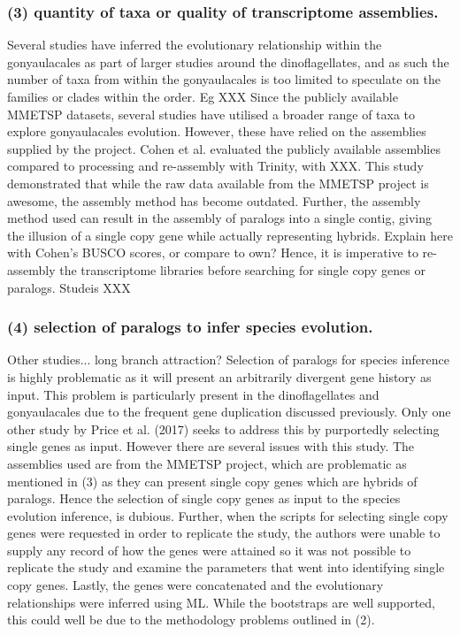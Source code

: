 \documentclass[12pt]{article}
\begin{document}
\subsubsection*{(3) quantity of taxa or quality of transcriptome assemblies.}
Several studies have inferred the evolutionary relationship within the gonyaulacales as part of larger studies around the dinoflagellates, and as such the number of taxa from within the gonyaulacales is too limited to speculate on the families or clades within the order. Eg XXX
Since the publicly available MMETSP datasets, several studies have utilised a broader range of taxa to explore gonyaulacales evolution. 
However, these have relied on the assemblies supplied by the project. 
Cohen et al. evaluated the publicly available assemblies compared to processing and re-assembly with Trinity, with XXX. 
This study demonstrated that while the raw data available from the MMETSP project is awesome, the assembly method has become outdated. 
Further, the assembly method used can result in the assembly of paralogs into a single contig, giving the illusion of a single copy gene while actually representing hybrids. 
Explain here with Cohen's BUSCO scores, or compare to own? Hence, it is imperative to re-assembly the transcriptome libraries before searching for single copy genes or paralogs.
Studeis XXX
\subsubsection*{(4) selection of paralogs to infer species evolution.}
Other studies... long branch attraction?
Selection of paralogs for species inference is highly problematic as it will present an arbitrarily divergent gene history as input. 
This problem is particularly present in the dinoflagellates and gonyaulacales due to the frequent gene duplication discussed previously.
Only one other study by Price et al. (2017) seeks to address this by purportedly selecting single genes as input. 
However there are several issues with this study. 
The assemblies used are from the MMETSP project, which are problematic as mentioned in (3) as they can present single copy genes which are hybrids of paralogs. 
Hence the selection of single copy genes as input to the species evolution inference, is dubious. 
Further, when the scripts for selecting single copy genes were requested in order to replicate the study, the authors were unable to supply any record of how the genes were attained so it was not possible to replicate the study and examine the parameters that went into identifying single copy genes. 
Lastly, the genes were concatenated and the evolutionary relationships were inferred using ML. While the bootstraps are well supported, this could well be due to the methodology problems outlined in (2).
\end{document}
